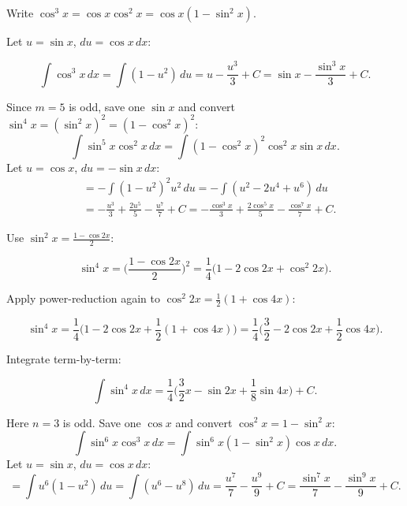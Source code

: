 \begin{examplebox}[title={Worked Example: $\displaystyle \int \cos^3 x\,dx$ (odd power)}]

Write $\cos^3x=\cos x\cos^2x=\cos x(1-\sin^2x)$.

Let $u=\sin x$, $du=\cos x\,dx$:

\[
\int \cos^3 x\,dx
=\int (1-u^2)\,du
=u-\frac{u^3}{3}+C
=\sin x-\frac{\sin^3 x}{3}+C.
\]

\end{examplebox}

\begin{examplebox}[title={Worked Example: $\displaystyle \int \sin^5 x\cos^2 x\,dx$ (Lecture Example 3.9)}]

Since $m=5$ is odd, save one $\sin x$ and convert $\sin^4x=(\sin^2x)^2=(1-\cos^2x)^2$:
\[
\int \sin^5x\cos^2x\,dx = \int (1-\cos^2x)^2\cos^2x\sin x\,dx.
\]
Let $u=\cos x$, $du=-\sin x\,dx$:
\begin{align*}
&= -\int (1-u^2)^2 u^2\,du = -\int (u^2-2u^4+u^6)\,du\\
&= -\frac{u^3}{3}+\frac{2u^5}{5}-\frac{u^7}{7}+C
= -\frac{\cos^3x}{3}+\frac{2\cos^5x}{5}-\frac{\cos^7x}{7}+C.
\end{align*}

\end{examplebox}

\begin{examplebox}[title={Worked Example: $\displaystyle \int \sin^4 x\,dx$ (even power)}]

Use $\sin^2x=\frac{1-\cos 2x}{2}$:

\[
\sin^4x=\Big(\frac{1-\cos 2x}{2}\Big)^2
=\frac14\Big(1-2\cos 2x+\cos^2 2x\Big).
\]

Apply power-reduction again to $\cos^2 2x=\frac12(1+\cos 4x)$:

\[
\sin^4x=\frac14\Big(1-2\cos 2x+\frac12(1+\cos 4x)\Big)
=\frac14\Big(\frac32-2\cos 2x+\frac12\cos 4x\Big).
\]

Integrate term-by-term:

\[
\int \sin^4x\,dx
=\frac14\Big(\frac32 x-\sin 2x+\frac18\sin 4x\Big)+C.
\]

\end{examplebox}

\begin{examplebox}[title={Worked Example (Tutorial 5, Q1(a)): $\displaystyle \int \sin^6x\cos^3x\,dx$}]

Here $n=3$ is odd. Save one $\cos x$ and convert $\cos^2x=1-\sin^2x$:
\[
\int \sin^6x\cos^3x\,dx = \int \sin^6x(1-\sin^2x)\cos x\,dx.
\]
Let $u=\sin x$, $du=\cos x\,dx$:
\[
= \int u^6(1-u^2)\,du = \int (u^6-u^8)\,du = \frac{u^7}{7}-\frac{u^9}{9}+C
= \frac{\sin^7x}{7}-\frac{\sin^9x}{9}+C.
\]

\end{examplebox}

